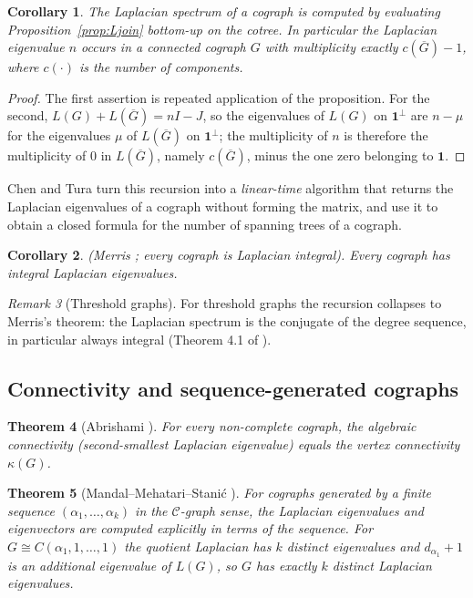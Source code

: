 \documentclass[11pt]{article}
\theoremstyle{plain}
\newtheorem{theorem}{Theorem}[section]
\newtheorem{corollary}[theorem]{Corollary}
\theoremstyle{definition}
\theoremstyle{remark}
\newtheorem{remark}[theorem]{Remark}
\begin{document}
	\begin{corollary}
		\label{cor:Lcotree}
		The Laplacian spectrum of a cograph is computed by evaluating Proposition~\ref{prop:Ljoin} bottom-up on the cotree. In particular the Laplacian eigenvalue $n$ occurs in a connected cograph $G$ with multiplicity exactly $c(\overline G)-1$, where $c(\cdot)$ is the number of components.
	\end{corollary}
	\begin{proof}
		The first assertion is repeated application of the proposition. For the second, $L(G)+L(\overline G)=nI-J$, so the eigenvalues of $L(G)$ on $\mathbf1^\perp$ are $n-\mu$ for the eigenvalues $\mu$ of $L(\overline G)$ on $\mathbf1^\perp$; the multiplicity of $n$ is therefore the multiplicity of $0$ in $L(\overline G)$, namely $c(\overline G)$, minus the one zero belonging to $\mathbf1$. \qedhere
	\end{proof}
	
	Chen and Tura \cite{ChenTura2024} turn this recursion into a \emph{linear-time} algorithm that returns the Laplacian eigenvalues of a cograph without forming the matrix, and use it to obtain a closed formula for the number of spanning trees of a cograph.
	
	\begin{corollary}
		(Merris \cite{Merris1994}; every cograph is Laplacian integral). Every cograph has integral Laplacian
		eigenvalues.
	\end{corollary}
	
	\begin{remark}[Threshold graphs]
		For threshold graphs the recursion collapses to Merris's theorem: the Laplacian spectrum is the conjugate of the degree sequence, in particular always integral (Theorem 4.1 of \cite{MannaMandal2026}).
	\end{remark}
	
	\subsection{Connectivity and sequence-generated cographs}
	
	\begin{theorem}[Abrishami \cite{Abrishami2019}]
		\label{thm:abrishami}
		For every non-complete cograph, the algebraic connectivity (second-smallest Laplacian eigenvalue) equals the vertex connectivity $\kappa(G)$.
	\end{theorem}
	
	\begin{theorem}[Mandal--Mehatari--Stanić \cite{MandalMehatariStanic2024}]
		\label{thm:cgraph-laplacian}
		For cographs generated by a finite sequence $(\alpha_1,\ldots,\alpha_k)$ in the $\mathcal{C}$-graph sense, the Laplacian eigenvalues and eigenvectors are computed explicitly in terms of the sequence. For $G\cong C(\alpha_1,1,\ldots,1)$ the quotient Laplacian has $k$ distinct eigenvalues and $d_{\alpha_1}+1$ is an additional eigenvalue of $L(G)$, so $G$ has exactly $k$ distinct Laplacian eigenvalues.
	\end{theorem}
	
\end{document}
